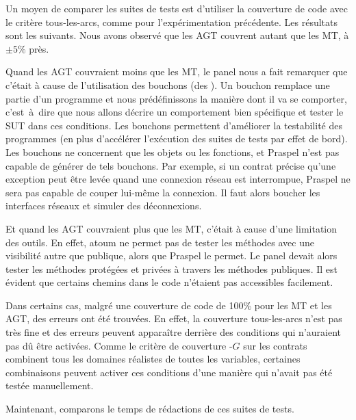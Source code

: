 
Un moyen de comparer les suites de tests est d'utiliser la couverture de code
avec le critère tous-les-arcs, comme pour l'expérimentation précédente.  Les
résultats sont les suivants. Nous avons observé que les AGT couvrent autant que
les MT, à $\pm 5\%$ près.

Quand les AGT couvraient moins que les MT, le panel nous a fait remarquer que
c'était à cause de l'utilisation des bouchons (des ). Un
bouchon remplace une partie d'un programme et nous prédéfinissons la manière
dont il va se comporter, c'est~à~dire que nous allons décrire un comportement
bien spécifique et tester le SUT dans ces conditions.  Les bouchons permettent
d'améliorer la testabilité des programmes (en plus d'accélérer l'exécution des
suites de tests par effet de bord). Les bouchons ne concernent que les objets ou
les fonctions, et Praspel n'est pas capable de générer de tels bouchons. Par
exemple, si un contrat précise qu'une exception peut être levée quand une
connexion réseau est interrompue, Praspel ne sera pas capable de couper lui-même
la connexion. Il faut alors boucher les interfaces réseaux et simuler des
déconnexions.

Et quand les AGT couvraient plus que les MT, c'était à cause d'une limitation
des outils. En effet, atoum ne permet pas de tester les méthodes avec une
visibilité autre que publique, alors que Praspel le permet. Le panel devait
alors tester les méthodes protégées et privées à travers les méthodes publiques.
Il est évident que certains chemins dans le code n'étaient pas accessibles
facilement.

Dans certains cas, malgré une couverture de code de 100\% pour les MT et les
AGT, des erreurs ont été trouvées. En effet, la couverture tous-les-arcs n'est
pas très fine et des erreurs peuvent apparaître derrière des conditions qui
n'auraient pas dû être activées. Comme le critère de couverture
-$G$ sur les contrats combinent tous les domaines réalistes de
toutes les variables, certaines combinaisons peuvent activer ces conditions
d'une manière qui n'avait pas été testée manuellement.

Maintenant, comparons le temps de rédactions de ces suites de tests.

